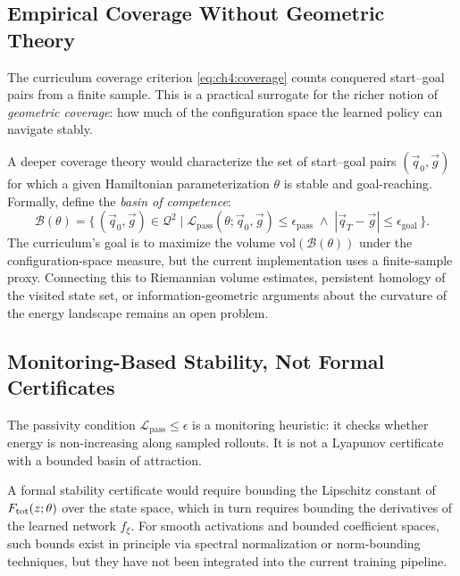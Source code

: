 \subsection{Empirical Coverage Without Geometric Theory}
\label{subsec:ch7:coverage}

The curriculum coverage criterion \eqref{eq:ch4:coverage} counts
conquered start–goal pairs from a finite sample.
This is a practical surrogate for the richer notion of
\emph{geometric coverage}: how much of the configuration space the
learned policy can navigate stably.

A deeper coverage theory would characterize the set of start–goal
pairs $(\vec{q}_0, \vec{g})$ for which a given Hamiltonian
parameterization $\theta$ is stable and goal-reaching.
Formally, define the \emph{basin of competence}:
\begin{equation}
  \mathcal{B}(\theta)
  = \bigl\{\,(\vec{q}_0, \vec{g}) \in \mathcal{Q}^2
    \;\big|\;
    \mathcal{L}_{\mathrm{pass}}(\theta;\vec{q}_0,\vec{g})
    \leq \epsilon_\mathrm{pass}
    \;\wedge\;
    |\vec{q}_T - \vec{g}| \leq \epsilon_{\mathrm{goal}}
  \,\bigr\}.
  \label{eq:ch7:basin}
\end{equation}
The curriculum's goal is to maximize the volume
$\mathrm{vol}(\mathcal{B}(\theta))$ under the configuration-space
measure, but the current implementation uses a finite-sample proxy.
Connecting this to Riemannian volume estimates, persistent homology
of the visited state set, or information-geometric arguments about
the curvature of the energy landscape remains an open problem.

\subsection{Monitoring-Based Stability, Not Formal Certificates}
\label{subsec:ch7:stability}

The passivity condition $\mathcal{L}_{\mathrm{pass}} \leq \epsilon$
is a monitoring heuristic: it checks whether energy is non-increasing
along sampled rollouts.
It is not a Lyapunov certificate with a bounded basin of attraction.

A formal stability certificate would require bounding the Lipschitz
constant of $F_{\mathrm{tot}}(z;\theta)$ over the state
space, which in turn requires bounding the derivatives of the learned
network $f_\xi$.
For smooth activations and bounded coefficient spaces, such bounds
exist in principle via spectral normalization or norm-bounding
techniques, but they have not been integrated into the current
training pipeline.

